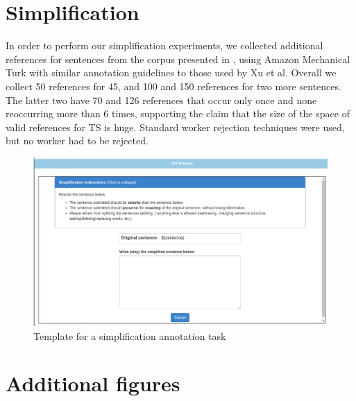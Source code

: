 \documentclass[letterpaper, 11pt]{article}
\begin{document}
\section{Simplification}
In order to perform our simplification experiments, 
we collected additional references for sentences from the corpus presented in , using Amazon
Mechanical Turk with similar annotation guidelines to those used by Xu et al. 
Overall we collect 50 references for 45, and 100 and 150 references for two more sentences.
The latter two have 70 and 126 references that occur only once and none reoccurring more than 6 times, 
supporting the claim that the size of the space of valid references for TS is huge.
Standard worker rejection techniques were used, but no worker had to be rejected.

\begin{figure}[htb]
	\includegraphics[width=0.9\columnwidth]{simplification_task}
	\caption{Template for a simplification annotation task} 
\end{figure}
\section{Additional figures}
\end{document}
